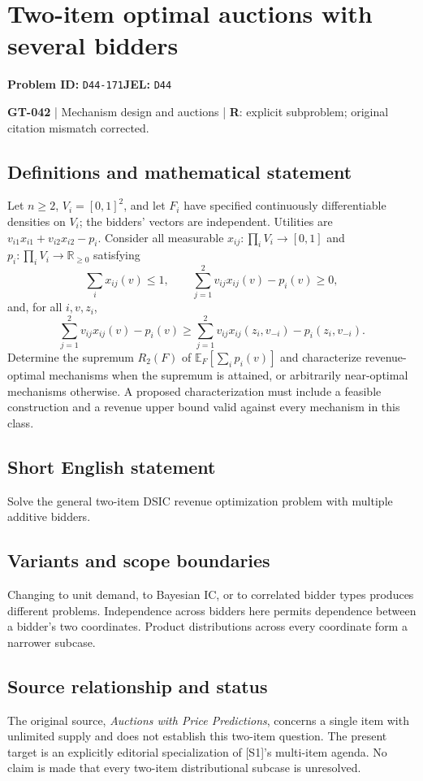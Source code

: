 \documentclass[11pt,a4paper]{article}
\begin{document}
\section*{Two-item optimal auctions with several bidders}
\textbf{Problem ID:} \texttt{D44-171}\quad \textbf{JEL:} \texttt{D44}\par
\label{problem:OP-0172}
\label{game:GT-042}
{\sffamily\small\color{muted}
\textbf{GT-042} | Mechanism design and auctions | \textbf{R}: explicit subproblem; original citation mismatch corrected.
\par}
\subsection*{Definitions and mathematical statement}
Let $n\geq2$, $V_i=[0,1]^2$, and let $F_i$ have specified continuously differentiable densities on $V_i$; the bidders' vectors are independent. Utilities are $v_{i1}x_{i1}+v_{i2}x_{i2}-p_i$. Consider all measurable $x_{ij}:\prod_iV_i\to[0,1]$ and $p_i:\prod_iV_i\to\mathbb R_{\geq0}$ satisfying
\[
 \sum_i x_{ij}(v)\leq1,\qquad
 \sum_{j=1}^2v_{ij}x_{ij}(v)-p_i(v)\geq0,
\]
and, for all $i,v,z_i$,
\[
 \sum_{j=1}^2v_{ij}x_{ij}(v)-p_i(v)
 \geq\sum_{j=1}^2v_{ij}x_{ij}(z_i,v_{-i})-p_i(z_i,v_{-i}).
\]
Determine the supremum $R_2(F)$ of $\mathbb E_F[\sum_i p_i(v)]$ and characterize revenue-optimal mechanisms when the supremum is attained, or arbitrarily near-optimal mechanisms otherwise. A proposed characterization must include a feasible construction and a revenue upper bound valid against every mechanism in this class.
\subsection*{Short English statement}
Solve the general two-item DSIC revenue optimization problem with multiple additive bidders.
\subsection*{Variants and scope boundaries}
Changing to unit demand, to Bayesian IC, or to correlated bidder types produces different problems. Independence across bidders here permits dependence between a bidder's two coordinates. Product distributions across every coordinate form a narrower subcase.
\subsection*{Source relationship and status}
The original source, \emph{Auctions with Price Predictions}, concerns a single item with unlimited supply and does not establish this two-item question. The present target is an explicitly editorial specialization of [S1]'s multi-item agenda. No claim is made that every two-item distributional subcase is unresolved.
\end{document}
